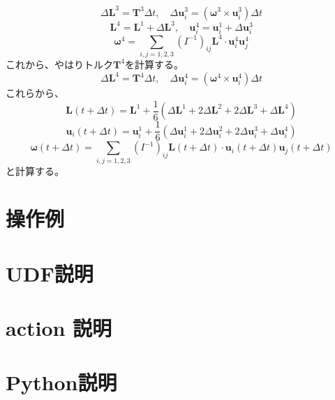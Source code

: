 \documentclass[a4paper,11pt]{jbook}
\begin{document}
\begin{equation}
\Delta \bm{L}^3=\bm{T}^3\Delta t, \quad \Delta\bm{u}_i^3=(\bm{\omega}^3\times\bm{u}_i^3)\Delta t
\end{equation}
\begin{equation}
\bm{L}^4=\bm{L}^1+\Delta \bm{L}^3,\quad\bm{u}_i^4=\bm{u}_i^1+\Delta\bm{u}_i^3
\end{equation}
\begin{equation}
 \bm{\omega}^4=\sum_{i,j=1,2,3}(I^{-1})_{ij}\bm{L}^4\cdot\bm{u}_i^4\bm{u}_j^4
\end{equation}
これから、やはりトルク$\bm{T}^4$を計算する。
\begin{equation}
\Delta \bm{L}^4=\bm{T}^4\Delta t, \quad \Delta\bm{u}_i^4=(\bm{\omega}^4\times\bm{u}_i^4)\Delta t
\end{equation}
これらから、
\begin{equation}
\bm{L}(t+\Delta t)=\bm{L}^1+\frac16(\Delta\bm{L}^1+2\Delta\bm{L}^2+2\Delta\bm{L}^3+\Delta\bm{L}^4)
\end{equation}
\begin{equation}
\bm{u}_i(t+\Delta t)=\bm{u}_i^1+\frac16(\Delta\bm{u}_i^1+2\Delta\bm{u}_i^2+2\Delta\bm{u}_i^3+\Delta\bm{u}_i^4)
\end{equation}
\begin{equation}
 \bm{\omega}(t+\Delta t)=\sum_{i,j=1,2,3}(I^{-1})_{ij}\bm{L}(t+\Delta t)\cdot\bm{u}_i(t+\Delta t)\bm{u}_j(t+\Delta t)
\end{equation}
と計算する。
 \chapter{操作例}
\chapter{UDF説明}
\chapter{action 説明}
\chapter{Python説明}
 
  
\end{document}
